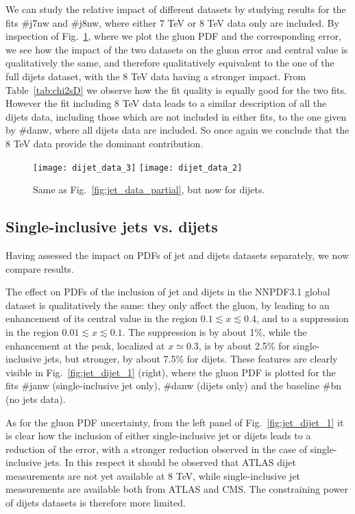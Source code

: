 %
We can study the relative impact of different datasets by studying results for the fits \#j7nw and \#j8nw, where 
either 7 TeV or 8 TeV data only are included.
By inspection of Fig.~\ref{fig:dijet_data_partial}, where we plot the gluon PDF and the corresponding error,
we see how the impact of the two datasets 
on the gluon error and central value is qualitatively the same, and therefore qualitatively equivalent to the one of the 
full dijets dataset, with the 8 TeV data having a stronger impact.
From Table~\ref{tab:chi2sD} we observe how the fit quality is equally good for the two fits.
However the fit including 8 TeV data leads to a similar description of all the dijets data, including those which are
not included in either fits, to the one given by \#danw, where all dijets data are included.
So once again we conclude that the 8 TeV data provide the dominant contribution.
    \begin{figure}[!t]
    \centering
    \texttt{[image: dijet\_data\_3]}
    \texttt{[image: dijet\_data\_2]}
    \caption{Same as Fig.~\ref{fig:jet_data_partial}, but now for dijets.}
    \label{fig:dijet_data_partial}
\end{figure}

\subsection{Single-inclusive jets vs. dijets}
Having assessed the impact on PDFs of jet and dijets datasets separately, we now compare results.

%
The effect on PDFs of the inclusion of jet and dijets in the NNPDF3.1 global dataset is qualitatively the same:
they only affect the gluon, by leading to an enhancement of its central value in the region
$0.1\lesssim x \lesssim 0.4$, and to a  
suppression in the region $0.01\lesssim x \lesssim 0.1$. The suppression
is by about  1\%, while the enhancement at the peak, localized at  $x\simeq 0.3$, is  by about 2.5\%
for single-inclusive jets, but stronger, by about 7.5\% for dijets.
These features are clearly visible in Fig.~\ref{fig:jet_dijet_1} (right), where the gluon PDF is plotted
for the fits \#janw (single-inclusive jet only), \#danw (dijets only) and the baseline \#bn (no jets data).

%
As for the gluon PDF uncertainty, from the left panel of Fig.~\ref{fig:jet_dijet_1} it is clear how
the inclusion of either single-inclusive jet or dijets leads to a reduction of the error, with a stronger
reduction observed in the case of single-inclusive jets. In this respect it should be observed that
ATLAS dijet measurements are not yet available at 8 TeV, while single-inclusive jet measurements are available both from
ATLAS and CMS. The constraining power of dijets datasets is therefore more limited.


